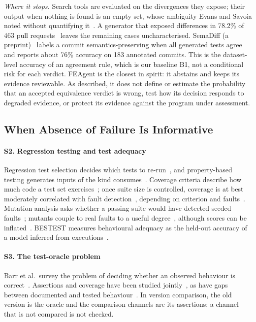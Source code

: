 \emph{Where it stops.} Search tools are evaluated on the divergences they expose; their output when nothing is found is an empty set, whose ambiguity Evans and Savoia noted without quantifying it~\cite{evans2007differential}. A generator that exposed differences in 78.2\% of 463 pull requests~\cite{hu2026difftestgen} leaves the remaining cases uncharacterised. SemaDiff (a preprint)~\cite{ayub2026semadiff} labels a commit semantics-preserving when all generated tests agree and reports about 76\% accuracy on 183 annotated commits. This is the dataset-level accuracy of an agreement rule, which is our baseline B1, not a conditional risk for each verdict. FEAgent is the closest in spirit: it abstains and keeps its evidence reviewable. As described, it does not define or estimate the probability that an accepted equivalence verdict is wrong, test how its decision responds to degraded evidence, or protect its evidence against the program under assessment.

\subsection{When Absence of Failure Is Informative}
\paragraph*{S2. Regression testing and test adequacy} Regression test selection decides which tests to re-run~\cite{rothermel1996analyzing,yoo2012regression}, and property-based testing generates inputs of the kind \sbg{} consumes~\cite{claessen2000quickcheck,maciver2019hypothesis}. Coverage criteria describe how much code a test set exercises~\cite{zhu1997software}; once suite size is controlled, coverage is at best moderately correlated with fault detection~\cite{inozemtseva2014coverage,gopinath2014code,kochhar2015code}, depending on criterion and faults~\cite{chekam2017empirical}. Mutation analysis asks whether a passing suite would have detected seeded faults~\cite{jia2011analysis,papadakis2019mutation}; mutants couple to real faults to a useful degree~\cite{just2014mutants}, although scores can be inflated~\cite{papadakis2018mutation}. BESTEST measures behavioural adequacy as the held-out accuracy of a model inferred from executions~\cite{fraser2012behaviourally,fraser2015assessing}.

\paragraph*{S3. The test-oracle problem} Barr et al.\ survey the problem of deciding whether an observed behaviour is correct~\cite{barr2015oracle}. Assertions and coverage have been studied jointly~\cite{zhang2015assertions}, as have gaps between documented and tested behaviour~\cite{paul2026beyond}. In version comparison, the old version is the oracle and the comparison channels are its assertions: a channel that is not compared is not checked.

